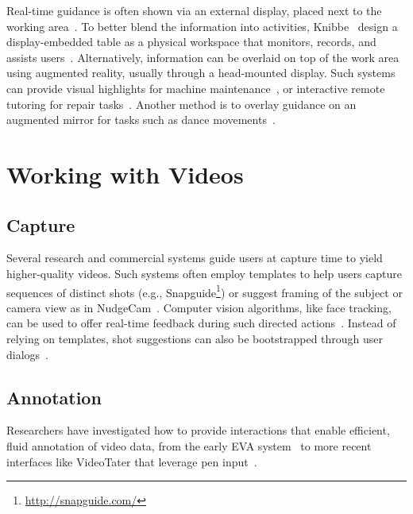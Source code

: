 Real-time guidance is often shown via an external display, placed next to the working area~\cite{Gupta:2012ku}. To better blend the information into activities, Knibbe~\ea{} design a display-embedded table as a physical workspace that monitors, records, and assists users~\cite{Knibbe:2015:SMI:2817721.2817741}.
%
Alternatively, information can be overlaid on top of the work area using augmented reality, usually through a head-mounted display. Such systems can provide visual highlights for machine maintenance~\cite{Henderson:2011ff}, or interactive remote tutoring for repair tasks~\cite{Gurevich:2012ko}.
%
Another method is to overlay guidance on an augmented mirror for tasks such as dance movements~\cite{Anderson:2013:YEM:2501988.2502045}.




\section{Working with Videos}


\subsection{Capture}
Several research and commercial systems guide users at capture time to yield higher-quality videos. Such systems often employ templates to help users capture sequences of distinct shots (e.g., Snapguide\footnote{\url{http://snapguide.com/}}) or suggest framing of the subject or camera view as in NudgeCam~\cite{Carter:2010}. Computer vision algorithms, like face tracking, can be used to offer real-time feedback during such directed actions~\cite{Davis:2003cu,Heer:2004ba,Carter:2010}. Instead of relying on templates, shot suggestions can also be bootstrapped through user dialogs~\cite{Adams:2005}.

\subsection{Annotation}
Researchers have investigated how to provide interactions that enable efficient, fluid annotation of video data, from the early EVA system~\cite{Mackay:1989} to more recent interfaces like VideoTater that leverage pen input~\cite{Diakopoulos:2006vt}.

